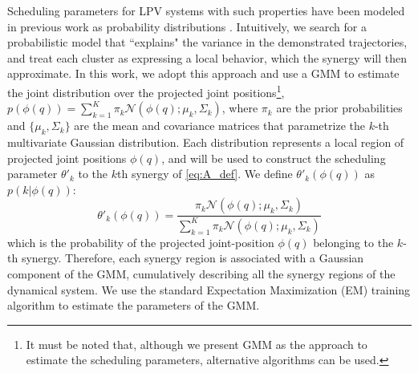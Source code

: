 \documentclass[letterpaper, 10 pt, conference,fleqn]{ieeeconf}
\begin{document}
Scheduling parameters for LPV systems with such properties have been modeled in previous work as probability distributions \cite{7439839, Salehian-RSS-16}. Intuitively, we search for a probabilistic model that ``explains" the variance in the demonstrated trajectories, and treat each cluster as expressing a local behavior, which the synergy will then approximate. In this work, we adopt this approach and use a GMM to estimate the joint distribution over the projected joint positions\footnote{It must be noted that, although we present GMM as the approach to estimate the scheduling parameters, alternative algorithms can be used.}, $p(\phi(q)) = \sum_{k=1}^K\pi_k\mathcal{N}(\phi(q);\mu_k,\Sigma_k)$, where $\pi_k$ are the prior probabilities and $\{\mu_k,\Sigma_k\}$ are the mean and covariance matrices that parametrize the $k$-th multivariate Gaussian distribution. Each distribution represents a local region of projected joint positions $\phi(q)$, and will be used to construct the scheduling parameter $\theta'_k$ to the $k$th synergy of \eqref{eq:A_def}. We define $\theta'_k(\phi(q))$ as $p(k|\phi(q))$:
\begin{equation}
\label{eq:theta}
\theta'_k(\phi(q))= \frac{\pi_k\mathcal{N} (\phi(q); \mu_k, \Sigma_k)}{\sum_{k=1}^K \pi_k\mathcal{N} (\phi(q); \mu_k, \Sigma_k)}
\end{equation}
which is the probability of the projected joint-position $\phi(q)$ belonging to the $k$-th synergy. Therefore, each synergy region is associated with a Gaussian component of the GMM, cumulatively describing all the synergy regions of the dynamical system. We use the standard Expectation Maximization (EM) training algorithm to estimate the parameters of the GMM.
\end{document}

